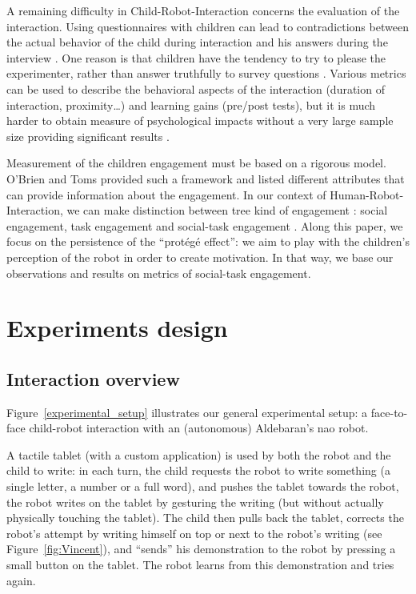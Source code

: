 \documentclass[conference]{IEEEtran}
\begin{document}
A remaining difficulty in Child-Robot-Interaction concerns the evaluation of the interaction. Using questionnaires with children can lead to contradictions between the actual behavior of the child during interaction and his answers during the interview \cite{lemaignan2015youre}. One reason is that children have the tendency to try to please the experimenter, rather than answer truthfully to survey questions \cite{belpaeme2013child}. Various metrics can be used to describe the behavioral aspects of the interaction (duration of interaction, proximity\ldots) and learning gains (pre/post tests), but it is much harder to obtain measure of psychological impacts without a very large sample size providing significant results \cite{belpaeme2013child}. 

Measurement of the children engagement must be based on a rigorous model. O'Brien and Toms \cite{o2008user} provided such a framework and listed different attributes that can provide information about the engagement. In our context of Human-Robot-Interaction, we can make distinction between tree kind of engagement : social engagement, task engagement and social-task engagement \cite{corrigan2013social}. Along this paper, we focus on the persistence of the ``prot\'eg\'e effect'': we aim to play with the children's perception of the robot in order to create motivation. In that way, we base our observations and results on metrics of social-task engagement. 


\section{Experiments design}
\subsection{Interaction overview}
Figure~\ref{experimental_setup} illustrates our general experimental setup: a
face-to-face child-robot interaction with an (autonomous) Aldebaran's {\sc nao}
robot.

A tactile tablet (with a custom application) is used by both the robot and the
child to write: in each turn, the child requests the robot to write
something (a single letter, a number or a full word), and pushes the tablet
towards the robot, the robot writes on the tablet by gesturing the writing (but
without actually physically touching the tablet). The child then pulls back the
tablet, corrects the robot's attempt by writing himself on top or next to
the robot's writing (see Figure~\ref{fig:Vincent}), and ``sends'' his
demonstration to the robot by pressing a small button on the tablet. The robot
learns from this demonstration and tries again.
\end{document}
